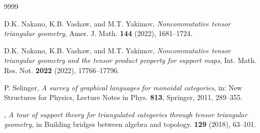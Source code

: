\documentclass[a4paper, 11pt]{amsart}
\theoremstyle{definition}
\theoremstyle{remark}
\numberwithin{equation}{section}
\begin{document}
\begin{thebibliography}{9999}

 {\sc D.K. Nakano, K.B. Vashaw, and M.T. Yakimov}, {\em Noncommutative tensor triangular geometry}, 
Amer. J. Math. {\bf 144} (2022), 1681–1724. 

 {\sc D.K. Nakano, K.B. Vashaw, and M.T. Yakimov}, {\em Noncommutative tensor triangular geometry and the tensor product property for support maps}, 
Int. Math. Res. Not. {\bf 2022} (2022), 17766–17796. 





{\sc P. Selinger},
{\em A survey of graphical languages for monoidal categories},
in: New Structures for Physics,
Lecture Notes in Phys. {\bf 813},
Springer, 2011, 289--355.

, {\em A tour of support theory for triangulated categories through tensor triangular geometry}, in Building bridges between algebra and topology. {\bf 129} (2018), 63--101.







\end{thebibliography}
\end{document}
